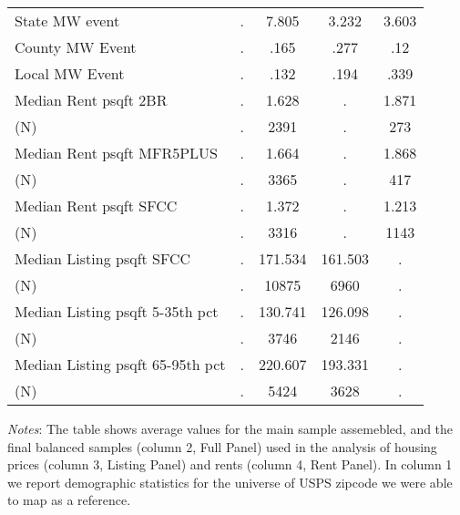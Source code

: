 \begin{table}[htb!]
{\begin{tabular}{l*{4}{c}}
State MW event&           .&       7.805&       3.232&       3.603\\
County MW Event&           .&        .165&        .277&         .12\\
Local MW Event&           .&        .132&        .194&        .339\\
Median Rent psqft 2BR&           .&       1.628&           .&       1.871\\
(N)         &           .&        2391&           .&         273\\
Median Rent psqft MFR5PLUS&           .&       1.664&           .&       1.868\\
(N)         &           .&        3365&           .&         417\\
Median Rent psqft SFCC&           .&       1.372&           .&       1.213\\
(N)         &           .&        3316&           .&        1143\\
Median Listing psqft SFCC&           .&     171.534&     161.503&           .\\
(N)         &           .&       10875&        6960&           .\\
Median Listing psqft 5-35th pct&           .&     130.741&     126.098&           .\\
(N)         &           .&        3746&        2146&           .\\
Median Listing psqft 65-95th pct&           .&     220.607&     193.331&           .\\
(N)         &           .&        5424&        3628&           .\\
\hline\hline
\end{tabular}}
    \begin{minipage}{.95\textwidth} \footnotesize
		\vspace{3mm} 
		\textit{Notes}: The table shows average values for the main sample assemebled, and the final balanced samples (column 2, Full Panel) used in the analysis of housing prices (column 3, Listing Panel) and rents (column 4, Rent Panel). In column 1 we report demographic statistics for the universe of USPS zipcode we were able to map as a reference. 
	\end{minipage}
\end{table}
    
\clearpage    